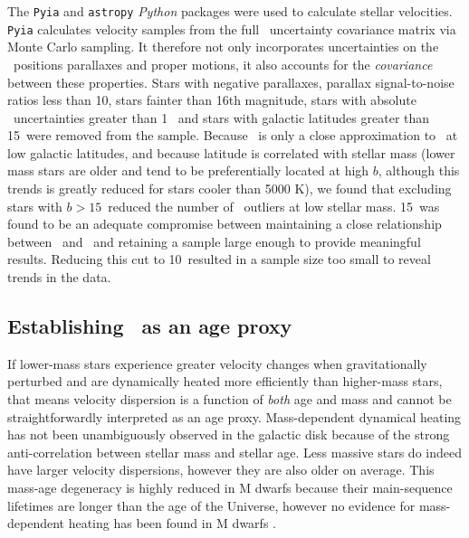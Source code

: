The {\tt Pyia} \citep{price-whelan_2018} and {\tt astropy} \citep{astropy2013,
astropy2018} {\it Python} packages were used to calculate stellar velocities.
{\tt Pyia} calculates velocity samples from the full \gaia\ uncertainty
covariance matrix via Monte Carlo sampling.
It therefore not only incorporates uncertainties on the \gaia\ positions
parallaxes and proper motions, it also accounts for the {\it covariance}
between these properties.
Stars with negative parallaxes, parallax signal-to-noise ratios less than 10,
stars fainter than 16th magnitude, stars with absolute \vb\ uncertainties
greater than 1 \kms\, and stars with galactic latitudes greater than
15\degrees\ were removed from the sample.
Because \vb\ is only a close approximation to \vz\ at low galactic latitudes,
and because latitude is correlated with stellar mass (lower mass stars are
older and tend to be preferentially located at high $b$, although this trends
is greatly reduced for stars cooler than 5000 K), we found that excluding
stars with $b > 15$\degrees\ reduced the number of \vb\ outliers at low
stellar mass.
15\degrees\ was found to be an adequate compromise between maintaining a close
relationship between \vb\ and \vz\ and retaining a sample large enough to
provide meaningful results.
Reducing this cut to 10\degrees\ resulted in a sample size too small to reveal
trends in the data.

\subsection{Establishing \vb\ as an age proxy}
\label{sec:mass-dependent-heating}

If lower-mass stars experience greater velocity changes when gravitationally
perturbed and are dynamically heated more efficiently than higher-mass stars,
that means velocity dispersion is a function of {\it both} age and mass and
cannot be straightforwardly interpreted as an age proxy.
Mass-dependent dynamical heating has not been unambiguously observed in the
galactic disk because of the strong anti-correlation between stellar mass and
stellar age.
Less massive stars do indeed have larger velocity dispersions, however they
are also older on average.
This mass-age degeneracy is highly reduced in M dwarfs because their
main-sequence lifetimes are longer than the age of the Universe, however no
evidence for mass-dependent heating has been found in M dwarfs
\citep{faherty2009}.

